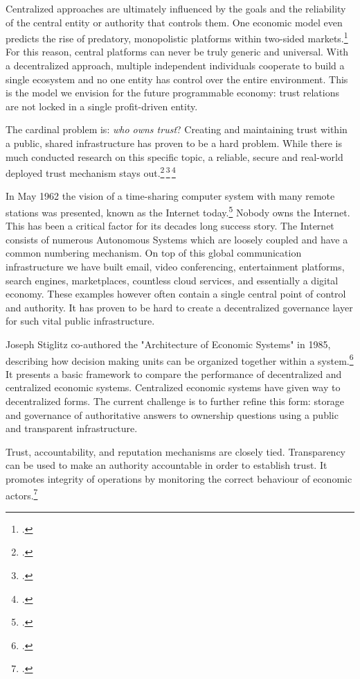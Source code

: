 \documentclass[USenglish]{article}
\begin{document}
Centralized approaches are ultimately influenced by the goals and the reliability of the central entity or authority that controls them. 
One economic model even predicts the rise of predatory, monopolistic platforms within two-sided markets.\footcite{loertscher2016predatory}
For this reason, central platforms can never be truly generic and universal. 
With a decentralized approach, multiple independent individuals cooperate to build a single ecosystem and no one entity has control over the entire environment.
This is the model we envision for the future programmable economy: trust relations are not locked in a single profit-driven entity.

The cardinal problem is: \emph{who owns trust}?
Creating and maintaining trust within a public, shared infrastructure has proven to be a hard problem.
While there is much conducted research on this specific topic, a reliable, secure and real-world deployed trust mechanism stays out.\footcite{delaviz2010improving}\,\footcite{delaviz2012sybilres}\,\footcite{kamvar2003eigentrust}

In May 1962 the vision of a time-sharing computer system with many remote stations was presented, known as the Internet today.\footcite{licklider1962line}
Nobody owns the Internet.
This has been a critical factor for its decades long success story.
The Internet consists of numerous Autonomous Systems which are loosely coupled and have a common numbering mechanism.
On top of this global communication infrastructure we have built email, video conferencing, entertainment platforms, search engines, marketplaces, countless cloud services, and essentially a digital economy.
These examples however often contain a single central point of control and authority.
It has proven to be hard to create a decentralized governance layer for such vital public infrastructure.

Joseph Stiglitz co-authored the "Architecture of Economic Systems" in 1985, describing how decision making units can be organized together within a system.\footcite{sah1985architecture}
It presents a basic framework to compare the performance of decentralized and centralized economic systems.
Centralized economic systems have given way to decentralized forms.
The current challenge is to further refine this form: storage and governance of authoritative answers to ownership questions using a public and transparent infrastructure.

Trust, accountability, and reputation mechanisms are closely tied.
Transparency can be used to make an authority accountable in order to establish trust. 
It promotes integrity of operations by monitoring the correct behaviour of economic actors.\footcite{troncoso2017systematizing}
\end{document}
